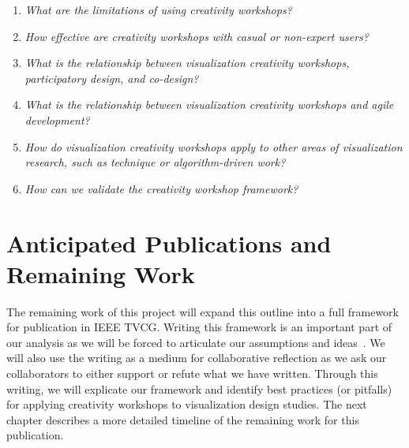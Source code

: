 \begin{enumerate}
    \item \emph{What are the limitations of using creativity workshops?}
    \item \emph{How effective are creativity workshops with casual or non-expert users?}
    \item \emph{What is the relationship between visualization creativity workshops, participatory design, and co-design?}
    \item \emph{What is the relationship between visualization creativity workshops and agile development?}
    \item \emph{How do visualization creativity workshops apply to other areas of visualization research, such as technique or algorithm-driven work?}
    \item \emph{How can we validate the creativity workshop framework?}
\end{enumerate}

\section{Anticipated Publications and Remaining Work}

The remaining work of this project will expand this outline into a full framework for publication in IEEE TVCG. Writing this framework is an important part of our analysis as we will be forced to articulate our assumptions and ideas~\cite{Richardson2005}. We will also use the writing as a medium for collaborative reflection as we ask our collaborators to either support or refute what we have written. Through this writing, we will explicate our framework and identify best practices (or pitfalls) for applying creativity workshops to visualization design studies. The next chapter describes a more detailed timeline of the remaining work for this publication.